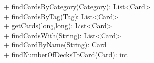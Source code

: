 { 
    + findCardsByCategory(Category): List<Card>\\
    + findCardsByTag(Tag): List<Card>\\
    + getCards(long,long): List<Card>\\
    + findCardsWith(String): List<Card>\\
    + findCardByName(String): Card\\
    + findNumberOfDecksToCard(Card): int
}{}